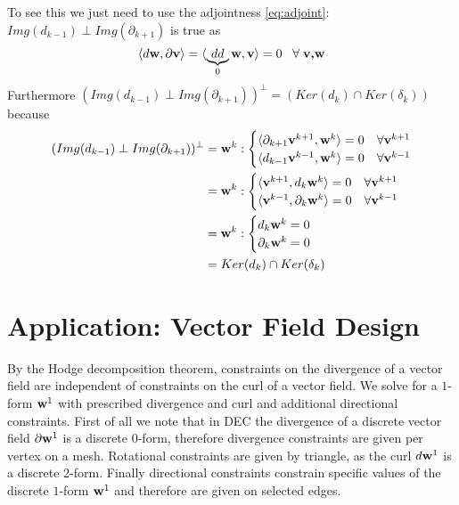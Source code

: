 To see this we just need to use the adjointness \ref{eq:adjoint}: $Img(d_{k-1}) \perp Img (\partial_{k+1})$ is true as
\[\langle d \textbf{w} , \partial \textbf{v}\rangle = \langle \underbrace{dd}_{0} \textbf{w} , \textbf{v} \rangle = 0 \;\;\; \forall\; \textbf{v,w}\]
Furthermore $(Img(d_{k-1}) \perp Img (\partial_{k+1}))^\perp = \left(Ker(d_k) \cap Ker(\delta_k)\right)$ because
\begin{align*}
(Img(d_{k-1}) \perp Img (\partial_{k+1}))^\perp &= \textbf{w}^k: \begin{cases} \langle \partial_{k+1}\textbf{v}^{k+1},\textbf{w}^k \rangle = 0 & \forall \textbf{v}^{k+1}\\
\langle d_{k-1}\textbf{v}^{k-1},\textbf{w}^k \rangle = 0 & \forall \textbf{v}^{k-1}\end{cases} \\
&= \textbf{w}^k: \begin{cases} \langle \textbf{v}^{k+1},d_{k}\textbf{w}^k \rangle = 0 & \forall \textbf{v}^{k+1}\\
\langle \textbf{v}^{k-1},\partial_{k}\textbf{w}^k \rangle = 0 & \forall \textbf{v}^{k-1}\end{cases} \\
&= \textbf{w}^k: \begin{cases} d_{k}\textbf{w}^k = 0 \\
\partial_{k}\textbf{w}^k  = 0 \end{cases}\\
&= Ker(d_k) \cap Ker(\delta_k)
\end{align*}





\section{Application: Vector Field Design}
By the Hodge decomposition theorem, constraints on the divergence of a vector field are independent of constraints on the curl of a vector field. We solve for a $1$-form $\textbf{w}^1$ with prescribed divergence and curl and additional directional constraints.
First of all we note that in DEC the divergence of a discrete vector field $\partial \textbf{w}^1$ is a discrete $0$-form, therefore divergence constraints are given per vertex on a mesh. Rotational constraints are given by triangle, as the curl $d\textbf{w}^1$ is a discrete $2$-form. Finally directional constraints constrain specific values of the discrete $1$-form $\textbf{w}^1$ and therefore are given on selected edges.

